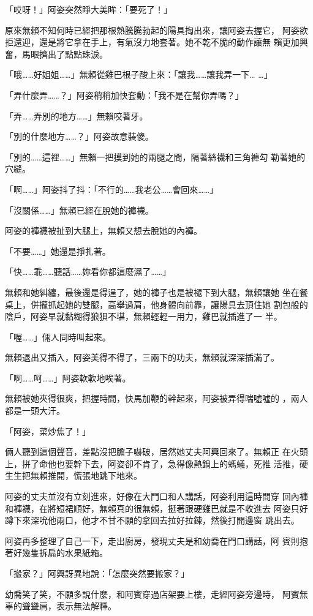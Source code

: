 「哎呀！」阿姿突然睜大美眸：「要死了！」

原來無賴不知何時已經把那根熱騰騰勃起的陽具掏出來，讓阿姿去握它，
阿姿欲拒還迎，還是將它拿在手上，有氣沒力地套著。她不乾不脆的動作讓無
賴更加興奮，馬眼擠出了點點珠淚。

「哦……好姐姐……」無賴從雞巴根子酸上來：「讓我……讓我弄一下…
…」

「弄什麼弄……？」阿姿稍稍加快套動：「我不是在幫你弄嗎？」

「弄……弄別的地方……」無賴咬著牙。

「別的什麼地方……？」阿姿故意裝傻。

「別的……這裡……」無賴一把摸到她的兩腿之間，隔著絲襪和三角褲勾
勒著她的穴縫。

「啊……」阿姿抖了抖：「不行的……我老公……會回來……」

「沒關係……」無賴已經在脫她的褲襪。

阿姿的褲襪被扯到大腿上，無賴又想去脫她的內褲。

「不要……」她還是掙扎著。

「快……乖……聽話……妳看你都這麼濕了……」

無賴和她糾纏，最後還是得逞了，她的褲子也是被褪下到大腿，無賴讓她
坐在餐桌上，併攏抓起她的雙腿，高舉過肩，他身體向前靠，讓陽具去頂住她
割包般的陰戶，阿姿早就黏糊得狼狽不堪，無賴輕輕一用力，雞巴就插進了一
半。

「喔……」倆人同時叫起來。

無賴退出又插入，阿姿美得不得了，三兩下的功夫，無賴就深深插滿了。

「啊……呵……」阿姿軟軟地唉著。

無賴被她夾得很爽，把握時間，快馬加鞭的幹起來，阿姿被弄得喘噓噓的
，兩人都是一頭大汗。

「阿姿，菜炒焦了！」

倆人聽到這個聲音，差點沒把膽子嚇破，居然她丈夫阿興回來了。無賴正
在火頭上，拼了命他也要幹下去，阿姿卻不肯了，急得像熱鍋上的螞蟻，死推
活推，硬生生把無賴推開，慌張地跳下地來。

阿姿的丈夫並沒有立刻進來，好像在大門口和人講話，阿姿利用這時間穿
回內褲和褲襪，在將短裙順好，無賴真的很無賴，挺著跟硬雞巴就是不收進去
阿姿只好蹲下來深吮他兩口，他才不甘不願的拿回去拉好拉鍊，然後打開邊窗
跳出去。

阿姿再多整理了自己一下，走出廚房，發現丈夫是和幼喬在門口講話，阿
賓則抱著好幾隻拆扁的水果紙箱。

「搬家？」阿興訝異地說：「怎麼突然要搬家？」

幼喬笑了笑，不願多說什麼，和阿賓穿過店架要上樓，走經阿姿旁邊時，
阿賓無辜的聳聳肩，表示無法解釋。

